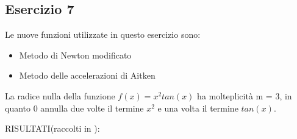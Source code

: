 \subsection{Esercizio 7}
Le nuove funzioni utilizzate in  questo esercizio sono:
\begin{itemize}
    \item Metodo di Newton modificato
    
    \item Metodo delle accelerazioni di Aitken
    
\end{itemize}
La radice nulla della funzione $f(x)=x^2tan(x)$ ha molteplicità m = 3, in quanto $0$ annulla due volte il termine
$x^2$ e una volta il termine $tan(x)$. 

RISULTATI(raccolti in ):

